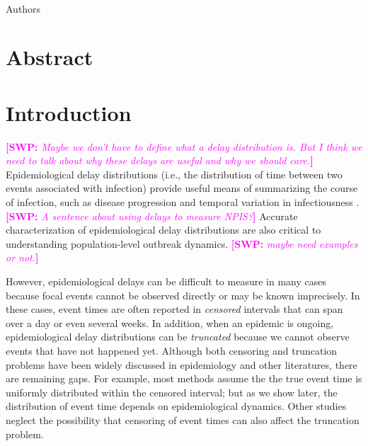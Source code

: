 \documentclass[12pt]{article}
\date{\today}
\newcommand{\comment}{\showcomment}
\newcommand{\showcomment}[3]{\textcolor{#1}{\textbf{[#2: }\textsl{#3}\textbf{]}}}
\newcommand{\swp}[1]{\comment{magenta}{SWP}{#1}}
\begin{document}
\begin{flushleft}{
	\Large
	\textbf{}
}
\newline
\\
Authors
\bigskip

\bigskip

\section*{Abstract}

\end{flushleft}

\pagebreak

\section{Introduction}

\swp{Maybe we don't have to define what a delay distribution is. But I think we need to talk about why these delays are useful and why we should care.}
Epidemiological delay distributions (i.e., the distribution of time between two events associated with infection) provide useful means of summarizing the course of infection, such as disease progression \citep{lauer2020incubation,verity2020estimates} and temporal variation in infectiousness \citep{madewell2022serial}.
\swp{A sentence about using delays to measure NPIS?}
Accurate characterization of epidemiological delay distributions are also critical to understanding population-level outbreak dynamics. \swp{maybe need examples or not.}

However, epidemiological delays can be difficult to measure in many cases because focal events cannot be observed directly or may be known imprecisely.
In these cases, event times are often reported in \emph{censored} intervals that can span over a day or even several weeks.
In addition, when an epidemic is ongoing, epidemiological delay distributions can be \emph{truncated} because we cannot observe events that have not happened yet.
Although both censoring and truncation problems have been widely discussed in epidemiology and other literatures, there are remaining gaps.
For example, most methods assume the the true event time is uniformly distributed within the censored interval;
but as we show later, the distribution of event time depends on epidemiological dynamics.
Other studies neglect the possibility that censoring of event times can also affect the truncation problem.
\end{document}
